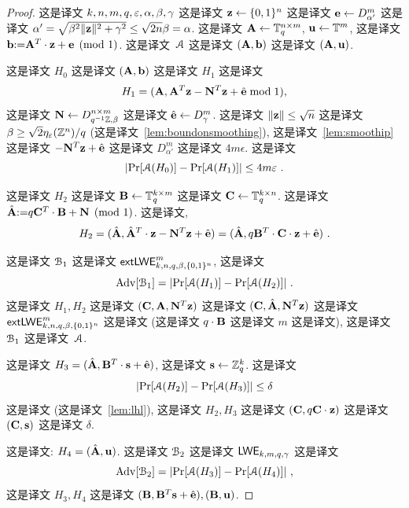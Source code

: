\begin{proof}
这是译文 $k,n,m,q,\varepsilon, \alpha, \beta, \gamma$ 这是译文 $\mathbf{{z}} \gets \{0,1\}^n$ 这是译文 $\mathbf{{e}} \gets D_{\alpha'}^m$ 这是译文 $\alpha' = \sqrt{\beta^2\|\mathbf{{z}}\|^2+ \gamma^2} \le \sqrt{2n}\beta=\alpha$. 这是译文 $\mathbf{{A}}\gets {\mathbb T}_q^{n \times m}$, $\mathbf{{u}} \gets {\mathbb T}^m$, 这是译文 $\mathbf{{b}} {:=} \mathbf{{A}}^T\cdot\mathbf{{z}}+\mathbf{{e}}\pmod{1}$. 这是译文~${\cal A}$ 这是译文 $(\mathbf{{A}}, \mathbf{{b}})$ 这是译文 $(\mathbf{{A}}, \mathbf{{u}})$.

这是译文 $H_0$ 这是译文 $(\mathbf{{A}}, \mathbf{{b}})$ 这是译文 $H_1$ 这是译文  \[ H_1 = (\mathbf{{A}}, \mathbf{{A}}^T\mathbf{{z}}-\mathbf{{N}}^T\mathbf{{z}}+\hat{\mathbf{{e}}} \bmod 1 ),\] 这是译文 $\mathbf{{N}}\gets D^{n \times m}_{q^{-1}{\mathbb Z}, \beta}$ 这是译文 $\hat{\mathbf{{e}}} \gets D_{\gamma}^m$. 这是译文 $\| \mathbf{{z}} \| \le \sqrt{n}$ 这是译文 $\beta \ge \sqrt{2} \eta_\varepsilon(\mathbb{Z}^n)/q$ (这是译文~\ref{lem:boundonsmoothing}), 这是译文~\ref{lem:smoothip} 这是译文 $-\mathbf{{N}}^T\mathbf{{z}}+\hat{\mathbf{{e}}}$ 这是译文 $D^m_{\alpha'}$ 这是译文 $4 m \epsilon$. 这是译文 \begin{equation}\label{eq:h0}
\lvert\Pr[{\cal A}(H_0)] - \Pr[{\cal A}(H_1)]\rvert \le 4m\varepsilon~.
\end{equation}


这是译文 $H_2$ 这是译文 $\mathbf{{B}} \gets {\mathbb T}_q^{k \times m}$ 这是译文 $\mathbf{{C}} \gets {\mathbb T}_q^{k \times n}$. 这是译文 $\hat{\mathbf{{A}}} {:=} q\mathbf{{C}}^T\cdot \mathbf{{B}} + \mathbf{{N}}\pmod{1}$. 这是译文, \[
H_2 = (\hat{\mathbf{{A}}}, \hat{\mathbf{{A}}}^T\cdot\mathbf{{z}} - \mathbf{{N}}^T\mathbf{{z}}+\hat{\mathbf{{e}}}) = (\hat{\mathbf{{A}}}, q\mathbf{{B}}^T\cdot \mathbf{{C}}\cdot\mathbf{{z}}+\hat{\mathbf{{e}}})~.
\]

这是译文 ${\cal B}_1$ 这是译文 $\mathsf{extLWE}^m_{k,n,q,\beta,\{0,1\}^n}$, 这是译文 \begin{equation}\label{eq:h1}
\mathrm{Adv}[{\cal B}_1] = \lvert\Pr[{\cal A}(H_1)]-\Pr[{\cal A}(H_2)]\rvert~.
\end{equation} 这是译文 $H_1, H_2$ 这是译文 $(\mathbf{{C}}, \mathbf{{A}}, \mathbf{{N}}^T\mathbf{{z}})$ 这是译文 $(\mathbf{{C}}, \hat{\mathbf{{A}}}, \mathbf{{N}}^T\mathbf{{z}})$ 这是译文 $\mathsf{extLWE}^m_{k,n,q,\beta,\{0,1\}^n}$ 这是译文 (这是译文 $q\cdot\mathbf{{B}}$ 这是译文 $m$ 这是译文), 这是译文 ${\cal B}_1$ 这是译文~${\cal A}$.

这是译文 $H_3 = (\hat{\mathbf{{A}}}, \mathbf{{B}}^T\cdot \mathbf{{s}}+\hat{\mathbf{{e}}})$, 这是译文 $\mathbf{{s}} \gets {\mathbb Z}_q^k$. 这是译文 \begin{equation}\label{eq:h2}
\lvert\Pr[{\cal A}(H_2)]- \Pr[{\cal A}(H_3)]\rvert \le \delta
\end{equation} 这是译文 (这是译文~\ref{lem:lhl}), 这是译文 $H_2, H_3$ 这是译文 $(\mathbf{{C}}, q\mathbf{{C}}\cdot\mathbf{{z}})$ 这是译文 $(\mathbf{{C}}, \mathbf{{s}})$ 这是译文 $\delta$.

这是译文: $H_4=(\hat{\mathbf{{A}}}, \mathbf{{u}})$. 这是译文 ${\cal B}_2$ 这是译文 $\mathsf{LWE}_{k,m,q,\gamma}$ 这是译文 \begin{equation}\label{eq:h3}
\mathrm{Adv}[{\cal B}_2] = \lvert\Pr[{\cal A}(H_3)]- \Pr[{\cal A}(H_4)]\rvert~,
\end{equation} 这是译文 $H_3, H_4$ 这是译文 $(\mathbf{{B}}, \mathbf{{B}}^T\mathbf{{s}}+\hat{\mathbf{{e}}}), (\mathbf{{B}}, \mathbf{{u}})$.


\end{proof}
